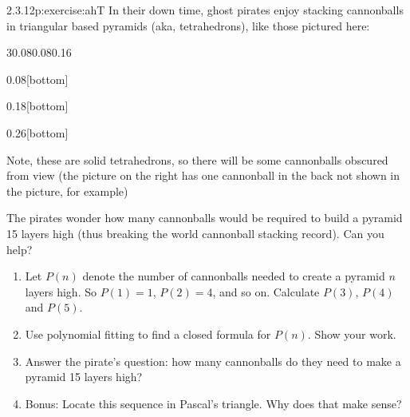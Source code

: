 \documentclass[twoside,11pt,]{book}
\numberwithin{equation}{chapter}
\begin{document}
\begin{divisionsolution}{2.3.12}{}{p:exercise:ahT}%
In their down time, ghost pirates enjoy stacking cannonballs in triangular based pyramids (aka, tetrahedrons), like those pictured here:%
\begin{sidebyside}{3}{0.08}{0.08}{0.16}%
\begin{sbspanel}{0.08}[bottom]%
%
\end{sbspanel}%
\begin{sbspanel}{0.18}[bottom]%
%
\end{sbspanel}%
\begin{sbspanel}{0.26}[bottom]%
%
\end{sbspanel}%
\end{sidebyside}%
\par
Note, these are solid tetrahedrons, so there will be some cannonballs obscured from view (the picture on the right has one cannonball in the back not shown in the picture, for example)%
\par
The pirates wonder how many cannonballs would be required to build a pyramid 15 layers high (thus breaking the world cannonball stacking record). Can you help?%
\begin{enumerate}[label=(\alph*)]
\item{}Let \(P(n)\) denote the number of cannonballs needed to create a pyramid \(n\) layers high. So \(P(1) = 1\), \(P(2) = 4\), and so on. Calculate \(P(3)\), \(P(4)\) and \(P(5)\). %
\item{}Use polynomial fitting to find a closed formula for \(P(n)\). Show your work. %
\item{}Answer the pirate's question: how many cannonballs do they need to make a pyramid 15 layers high? %
\item{}Bonus: Locate this sequence in Pascal's triangle. Why does that make sense?%
\end{enumerate}
%
\end{divisionsolution}%
\end{document}
